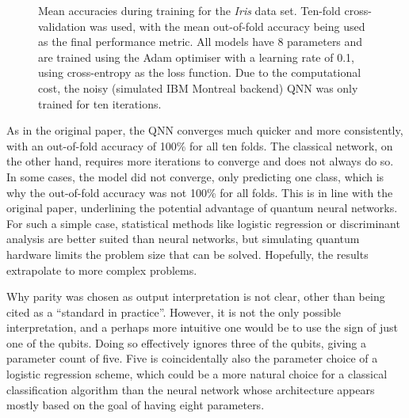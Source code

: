 \begin{figure}
    \centering
    \caption{
        Mean accuracies during training for the \textit{Iris} data set.
        Ten-fold cross-validation was used, with the mean out-of-fold accuracy being used as the final performance metric.
        All models have 8 parameters and are trained using the Adam optimiser with a learning rate of 0.1, using cross-entropy as the loss function.
        Due to the computational cost, the noisy (simulated IBM Montreal backend) QNN was only trained for ten iterations.
    }
    \label{fig:iris_training}
\end{figure}


As in the original paper, the QNN converges much quicker and more consistently, with an out-of-fold accuracy of 100\% for all ten folds.
The classical network, on the other hand, requires more iterations to converge and does not always do so.
In some cases, the model did not converge, only predicting one class, which is why the out-of-fold accuracy was not 100\% for all folds.
This is in line with the original paper, underlining the potential advantage of quantum neural networks.
For such a simple case, statistical methods like logistic regression or discriminant analysis are better suited than neural networks, but simulating quantum hardware limits the problem size that can be solved.
Hopefully, the results extrapolate to more complex problems.

Why parity was chosen as output interpretation is not clear, other than being cited as a \enquote{standard in practice}.
However, it is not the only possible interpretation, and a perhaps more intuitive one would be to use the sign of just one of the qubits.
Doing so effectively ignores three of the qubits, giving a parameter count of five.
Five is coincidentally also the parameter choice of a logistic regression scheme, which could be a more natural choice for a classical classification algorithm than the neural network whose architecture appears mostly based on the goal of having eight parameters.

